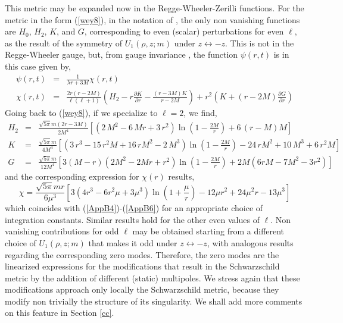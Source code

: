 \documentclass[12pt,aps,floats,showpacs,amssymb,tightenlines]{revtex4}
\begin{document}
This metric may be expanded now in the Regge-Wheeler-Zerilli functions. For the metric
in the form (\ref{wey8}), in the notation of \cite{RW}, the only non vanishing functions
are $H_0$, $H_2$, $K$, and $G$, corresponding to even (scalar) perturbations for even $\ell$, as the result of the  symmetry of $U_1(\rho,z;m)$ under $ z \leftrightarrow -z$.
This is not in the Regge-Wheeler gauge, but, from gauge invariance \cite{moncrief},
the function $\psi(r,t)$ is in this case given by,
\begin{eqnarray}
\label{wey9}
\psi(r,t) & = & \frac{1}{\lambda r+3M} \chi(r,t) \nonumber \\
\chi(r,t) & = & \frac{2r \left(r -2M\right)}{\ell (\ell+1) }  \left( H_2   -r{
\frac {\partial K}{\partial r}}   -{\frac { \left( r-
3M \right) K  }{r-2M}} \right)  + {r}^{2}  \left( K   +
 \left(r -2M \right) {\frac {\partial G}{\partial r}}    \right)
\end{eqnarray}
Going back to (\ref{wey8}), if we specialize to $\ell=2$, we find,
\begin{eqnarray}
\label{wey10}
H_2 & = & {\frac {\sqrt {
5 \pi } m \left( 2r-3M\right)  }{2{M}^{4}}} \left[  \left( 2\,{M}^{2}-6
\,Mr+3\,{r}^{2} \right)  \ln  \left(1 -\frac{2M }{r}\right) +6\, \left( r-M \right) M \right]
  \nonumber \\
K & = &  {\frac {\sqrt {5 \pi } m }{4{M}^{4}}}\left[ \left( 3\,{r}^{
3}-15\,{r}^{2}M+16\,r{M}^{2}-2\,{M}^{3} \right)   \ln  \left(1 - \frac{2M}{r}
\right) -24\,r{M}^{2}+10\,{M}^{
3}+6\,{r}^{2}M \right]
\nonumber \\
G & = & {\frac {\sqrt {5 \pi }m}{12{M}^{4}}} \left[ 3 \left(M- r
 \right)  \left( 2{M}^{2}-2Mr+{r}^{2} \right)  \ln
 \left(1 -\frac{2M}{r} \right)
+2 M \left(6 r M -7 M^2 -3 r^2 \right)
  \right]
\end{eqnarray}
and the corresponding expression for $\chi(r)$ results,
\begin{equation}
\label{wey11}
\chi= {\frac {  \sqrt {5 \pi } m r }{6{\mu}^{3}}}\left[ 3 \left( 4{r}^{3}-6{r}^{2}\mu+3{\mu}^{3}
 \right)   \ln  \left( 1+\frac{\mu}{r}
 \right)  -12\mu {r}^{2}+24\mu^2 r-13{\mu}^{3}
 \right]
\end{equation}
which coincides with (\ref{AppB4})-(\ref{AppB6}) for  an appropriate
choice of integration constants. Similar results hold for the other
even values of $\ell$. Non vanishing contributions for odd $\ell$ may be
 obtained starting from a different choice of $U_1(\rho,z;m)$ that
 makes it odd under $z \longleftrightarrow -z$, with analogous results
 regarding the corresponding zero modes. Therefore, the zero modes are the linearized
expressions for the modifications that result in the Schwarzschild
metric by the addition of different (static) multipoles. We stress
again that these modifications approach only locally the
Schwarzschild metric, because they modify non trivially the structure of its
singularity. We shall add more comments on this feature in Section
\ref{cc}.
\end{document}
